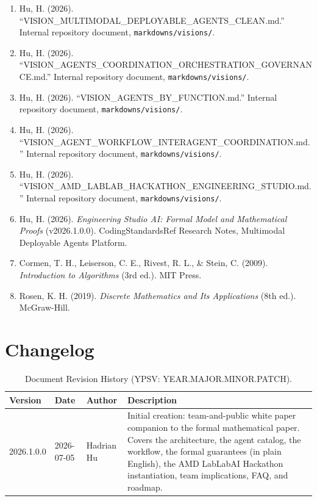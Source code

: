 \documentclass[12pt]{article}
\begin{document}
\begin{sloppypar}
\begin{enumerate}
    \item Hu, H. (2026). ``VISION\_MULTIMODAL\_\allowbreak DEPLOYABLE\_AGENTS\_CLEAN.md.''
          Internal repository document, \texttt{markdowns/visions/}.
    \item Hu, H. (2026). ``VISION\_AGENTS\_COORDINATION\_\allowbreak ORCHESTRATION\_\allowbreak GOVERNANCE.md.'' Internal repository document,
          \texttt{markdowns/visions/}.
    \item Hu, H. (2026). ``VISION\_AGENTS\_BY\_FUNCTION.md.'' Internal
          repository document, \texttt{markdowns/visions/}.
    \item Hu, H. (2026). ``VISION\_AGENT\_WORKFLOW\_INTERAGENT\_\allowbreak COORDINATION.md.'' Internal repository document,
          \texttt{markdowns/visions/}.
    \item Hu, H. (2026). ``VISION\_AMD\_LABLAB\_HACKATHON\_ENGINEERING\_\allowbreak STUDIO.md.'' Internal repository document,
          \texttt{markdowns/visions/}.
    \item Hu, H. (2026). \textit{Engineering Studio AI: Formal Model and
          Mathematical Proofs} (v2026.1.0.0). CodingStandardsRef Research
          Notes, Multimodal Deployable Agents Platform.
    \item Cormen, T. H., Leiserson, C. E., Rivest, R. L., \& Stein, C.
          (2009). \textit{Introduction to Algorithms} (3rd ed.). MIT Press.
    \item Rosen, K. H. (2019). \textit{Discrete Mathematics and Its
          Applications} (8th ed.). McGraw-Hill.
\end{enumerate}
\end{sloppypar}

\newpage
\section*{Changelog}
\label{sec:changelog}

\begin{table}[H]
\centering
\caption{Document Revision History (YPSV: YEAR.MAJOR.MINOR.PATCH).}
\begin{tabular}{@{}lllp{7.0cm}@{}}
\toprule
\textbf{Version} & \textbf{Date} & \textbf{Author} & \textbf{Description} \\
\midrule
2026.1.0.0 & 2026-07-05 & Hadrian Hu &
  Initial creation: team-and-public white paper companion to the
  formal mathematical paper.
  Covers the architecture, the agent catalog, the workflow, the
  formal guarantees (in plain English), the AMD LabLabAI Hackathon
  instantiation, team implications, FAQ, and roadmap. \\
\bottomrule
\end{tabular}
\end{table}
\end{document}
